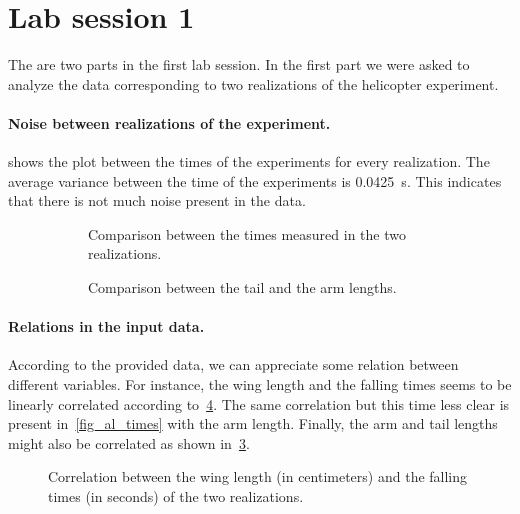 \section{Lab session 1}

The are two parts in the first lab session. In the first part we were asked to
analyze the data corresponding to two realizations of the helicopter experiment.
\paragraph{Noise between realizations of the experiment.}

 shows the plot between the times of the experiments for every
realization. The average variance between the time of the experiments is
\SI{0.0425}{\second}. This indicates that there is not much noise present in the
data.

\begin{figure}
  \begin{subfigure}[h]{.5\linewidth}
    
    \caption{Comparison between the times measured in the two realizations.}
    \label{fig_t1t2}
  \end{subfigure}
  \begin{subfigure}[h]{.5\linewidth}
    
    \caption{Comparison between the tail and the arm lengths.}
    \label{fig_tl_al}
  \end{subfigure}
  \caption{}
\end{figure}

\paragraph{Relations in the input data.}
According to the provided data, we can appreciate some relation between
different variables. For instance, the wing length and the falling times seems
to be linearly correlated according to~\cref{fig_wl_times}. The same correlation
but this time less clear is present in~\cref{fig_al_times} with the arm length.
Finally, the arm and tail lengths might also be correlated as shown
in~\cref{fig_tl_al}.
\begin{figure}
  \centering
  
  \caption{Correlation between the wing length (in centimeters) and the falling
  times (in seconds) of the two realizations.}
  \label{fig_wl_times}
\end{figure}

